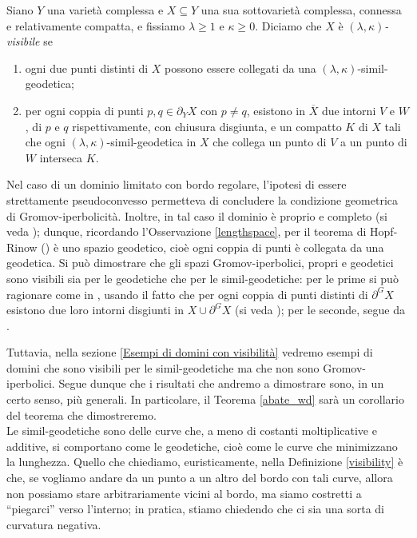 \begin{defn} \label{visibility}
    Siano $Y$ una varietà complessa e $X\subseteq Y$ una sua sottovarietà complessa, connessa e relativamente compatta, e fissiamo $\lambda \ge 1$ e $\kappa \ge 0$. Diciamo che $X$ è \textit{$(\lambda,\kappa)$-visibile} se
    \begin{enumerate}
        \item ogni due punti distinti di $X$ possono essere collegati da una $(\lambda,\kappa)$-simil-geodetica;
        \item per ogni coppia di punti $p,q\in\partial_YX$ con $p\not=q$, esistono in $\overline{X}$ due intorni $V$ e $W$, di $p$ e $q$ rispettivamente, con chiusura disgiunta, e un compatto $K$ di $X$ tali che  ogni $(\lambda,\kappa)$-simil-geodetica in $X$ che collega un punto di $V$ a un punto di $W$ interseca $K$.
    \end{enumerate}
\end{defn}

\begin{oss} \label{spscvxisvis}
    Nel caso di un dominio limitato con bordo regolare, l'ipotesi di essere strettamente pseudoconvesso permetteva di concludere la condizione geometrica di Gromov-iperbolicità. Inoltre, in tal caso il dominio è proprio e completo (si veda \cite[Paragraph 3.3]{G}); dunque, ricordando l'Osservazione \ref{lengthspace}, per il teorema di Hopf-Rinow (\cite[Part I, Proposition 3.7]{BH}) è uno spazio geodetico, cioè ogni coppia di punti è collegata da una geodetica. Si può dimostrare che gli spazi Gromov-iperbolici, propri e geodetici sono visibili sia per le geodetiche che per le simil-geodetiche: per le prime si può ragionare come in \cite[Proposition 2.5]{BNT}, usando il fatto che per ogni coppia di punti distinti di $\partial^G X$ esistono due loro intorni disgiunti in $X\cup\partial^GX$ (si veda \cite[Part III, Chapter H, Lemma 3.6]{BH}); per le seconde, segue da \cite[Part III, Chapter H, Theorem 1.7]{BH}.
\end{oss}

Tuttavia, nella sezione \ref{Esempi di domini con visibilità} vedremo esempi di domini che sono visibili per le simil-geodetiche ma che non sono Gromov-iperbolici. Segue dunque che i risultati che andremo a dimostrare sono, in un certo senso, più generali. In particolare, il Teorema \ref{abate_wd} sarà un corollario del teorema che dimostreremo. \\

Le simil-geodetiche sono delle curve che, a meno di costanti moltiplicative e additive, si comportano come le geodetiche, cioè come le curve che minimizzano la lunghezza.
Quello che chiediamo, euristicamente, nella Definizione \ref{visibility} è che, se vogliamo andare da un punto a un altro del bordo con tali curve, allora non possiamo stare arbitrariamente vicini al bordo, ma siamo costretti a ``piegarci'' verso l'interno; in pratica, stiamo chiedendo che ci sia una sorta di curvatura negativa.

